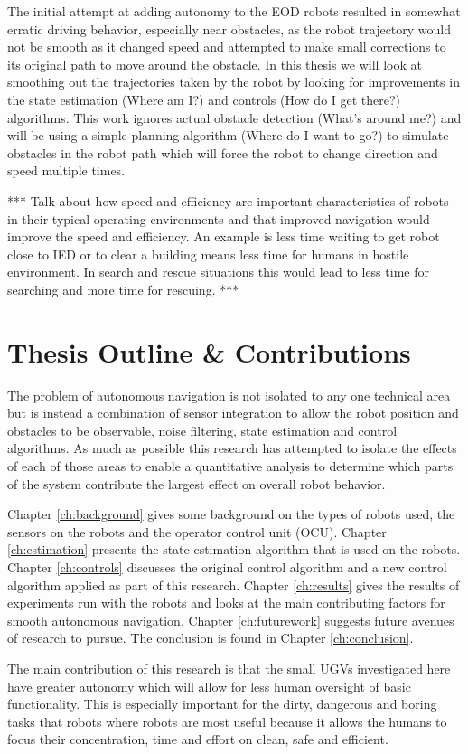 The initial attempt at adding autonomy to the EOD robots resulted in somewhat erratic driving behavior, especially near obstacles, as the robot trajectory would not be smooth as it changed speed and attempted to make small corrections to its original path to move around the obstacle. In this thesis we will look at smoothing out the trajectories taken by the robot by looking for improvements in the state estimation (Where am I?) and controls (How do I get there?) algorithms. This work ignores actual obstacle detection (What's around me?) and will be using a simple planning algorithm (Where do I want to go?) to simulate obstacles in the robot path which will force the robot to change direction and speed multiple times.

*** Talk about how speed and efficiency are important characteristics of robots in their typical operating environments and that improved navigation would improve the speed and efficiency. An example is less time waiting to get robot close to IED or to clear a building means less time for humans in hostile environment. In search and rescue situations this would lead to less time for searching and more time for rescuing. ***

\section{Thesis Outline \& Contributions}
The problem of autonomous navigation is not isolated to any one technical area but is instead a combination of sensor integration to allow the robot position and obstacles to be observable, noise filtering, state estimation and control algorithms. As much as possible this research has attempted to isolate the effects of each of those areas to enable a quantitative analysis to determine which parts of the system contribute the largest effect on overall robot behavior.

Chapter \ref{ch:background} gives some background on the types of robots used, the sensors on the robots and the operator control unit (OCU). Chapter \ref{ch:estimation} presents the state estimation algorithm that is used on the robots. Chapter \ref{ch:controls} discusses the original control algorithm and a new control algorithm applied as part of this research. Chapter \ref{ch:results} gives the results of experiments run with the robots and looks at the main contributing factors for smooth autonomous navigation. Chapter \ref{ch:futurework} suggests future avenues of research to pursue. The conclusion is found in Chapter \ref{ch:conclusion}.

The main contribution of this research is that the small UGVs investigated here have greater autonomy which will allow for less human oversight of basic functionality. This is especially important for the dirty, dangerous and boring tasks that robots where robots are most useful because it allows the humans to focus their concentration, time and effort on clean, safe and efficient.